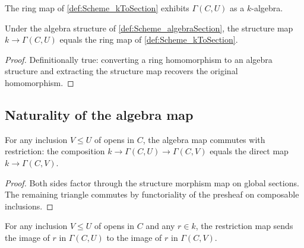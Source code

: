 \begin{definition}
  \label{def:Scheme_algebraSection}

  The ring map of \cref{def:Scheme_kToSection} exhibits \(\Gamma(C, U)\) as a \(k\)-algebra.
\end{definition}

\begin{lemma}
  \label{lem:Scheme_algebraMap_eq_kToSection}

  Under the algebra structure of \cref{def:Scheme_algebraSection}, the structure map \(k \to \Gamma(C, U)\) equals the ring map of \cref{def:Scheme_kToSection}.
\end{lemma}

\begin{proof}
  
  \leanok
  Definitionally true: converting a ring homomorphism to an algebra structure and extracting the structure map recovers the original homomorphism.
\end{proof}

\subsection{Naturality of the algebra map}

\begin{lemma}
  \label{lem:Scheme_kToSection_naturality}

  For any inclusion \(V \le U\) of opens in \(C\), the algebra map commutes with restriction: the composition \(k \to \Gamma(C, U) \to \Gamma(C, V)\) equals the direct map \(k \to \Gamma(C, V)\).
\end{lemma}

\begin{proof}
  
  \leanok
  Both sides factor through the structure morphism map on global sections. The remaining triangle commutes by functoriality of the presheaf on composable inclusions.
\end{proof}

\begin{lemma}
  \label{lem:Scheme_algebraMap_naturality}

  For any inclusion \(V \le U\) of opens in \(C\) and any \(r \in k\), the restriction map sends the image of \(r\) in \(\Gamma(C, U)\) to the image of \(r\) in \(\Gamma(C, V)\).
\end{lemma}

